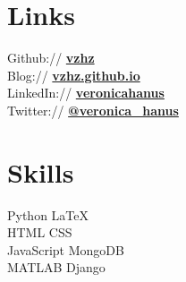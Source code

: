 \documentclass[letterpaper]{deedy-resume} %
\begin{document}
\begin{minipage}[t]{0.33\textwidth} %


\section{Links} 

Github:// \href{https://github.com/vzhz}{\bf vzhz} \\
Blog:// \href{https://vzhz.github.io}{\bf vzhz.github.io} \\
LinkedIn:// \href{https://www.linkedin.com/in/veronicahanus}{\bf veronicahanus} \\
Twitter:// \href{https://twitter.com/verwonica_hanus}{\bf @veronica\_hanus}
\sectionspace %


\section{Skills}


Python \textbullet{} \LaTeX \\%
HTML \textbullet{} CSS \\
JavaScript \textbullet{} MongoDB \\%
MATLAB \textbullet{} Django \\%

\sectionspace %



\end{minipage}
\end{document}
